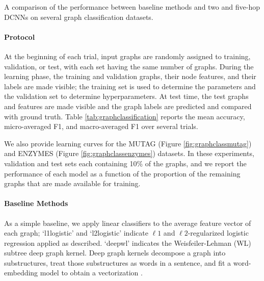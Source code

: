\documentclass{article}
\begin{document}
\begin{table}[h]
    \vspace{10pt}
    
    \caption{A comparison of the performance between baseline methods and two and five-hop DCNNs on several graph classification datasets.}
    \label{tab:graphclassification}
\end{table}

\paragraph{Protocol} At the beginning of each trial, input graphs are randomly assigned to training, validation, or test, with each set having the same number of graphs.  During the learning phase, the training and validation graphs, their node features, and their labels are made visible; the training set is used to determine the parameters and the validation set to determine hyperparameters.  At test time, the test graphs and features are made visible and the graph labels are predicted and compared with ground truth.  Table \ref{tab:graphclassification} reports the mean accuracy, micro-averaged F1, and macro-averaged F1 over several trials.

We also provide learning curves for the MUTAG (Figure \ref{fig:graphclassmutag}) and ENZYMES (Figure \ref{fig:graphclassenzymes}) datasets.  In these experiments, validation and test sets each containing 10\% of the graphs, and we report the performance of each model as a function of the proportion of the remaining graphs that are made available for training.  

\paragraph{Baseline Methods} As a simple baseline, we apply linear classifiers to the average feature vector of each graph; `l1logistic' and `l2logistic' indicate $\ell 1$ and $\ell 2$-regularized logistic regression applied as described.  `deepwl' indicates the Weisfeiler-Lehman (WL) subtree deep graph kernel.  Deep graph kernels decompose a graph into substructures, treat those substructures as words in a sentence, and fit a word-embedding model to obtain a vectorization \cite{Yanardag:2015fm}. 
\end{document}
